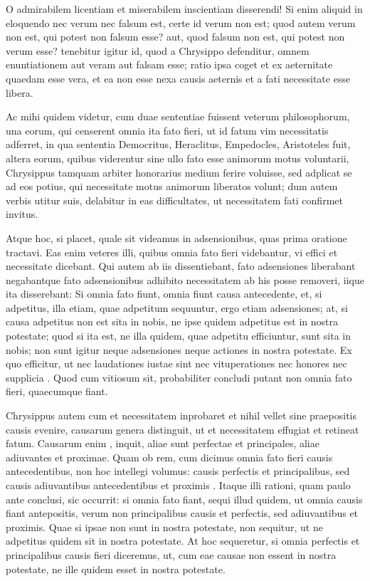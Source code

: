  O admirabilem licentiam et miserabilem inscientiam disserendi! Si enim aliquid in eloquendo nec verum nec falsum est, certe id verum non est; quod autem verum non est, qui potest non falsum esse? aut, quod falsum non est, qui potest non verum esse? tenebitur igitur id, quod a Chrysippo defenditur, omnem enuntiationem aut veram aut falsam esse; ratio ipsa coget et ex aeternitate quaedam esse vera, et ea non esse nexa causis aeternis et a fati necessitate esse libera.

 Ac mihi quidem videtur, cum duae sententiae fuissent veterum philosophorum, una eorum, qui censerent omnia ita fato fieri, ut id fatum vim necessitatis adferret, in qua sententia Democritus, Heraclitus, Empedocles, Aristoteles fuit, altera eorum, quibus viderentur sine ullo fato esse animorum motus voluntarii, Chrysippus tamquam arbiter honorarius medium ferire voluisse, sed adplicat se ad eos potius, qui necessitate motus animorum liberatos volunt; dum autem verbis utitur suis, delabitur in eas difficultates, ut necessitatem fati confirmet invitus.

 Atque hoc, si placet, quale sit videamus in adsensionibus, quas prima oratione tractavi. Eas enim veteres illi, quibus omnia fato fieri videbantur, vi effici et necessitate dicebant. Qui autem ab iis dissentiebant, fato adsensiones liberabant negabantque fato adsensionibus adhibito necessitatem ab his posse removeri, iique ita disserebant: Si omnia fato fiunt, omnia fiunt causa antecedente, et, si adpetitus, illa etiam, quae adpetitum sequuntur, ergo etiam adsensiones; at, si causa adpetitus non est sita in nobis, ne ipse quidem adpetitus est in nostra potestate; quod si ita est, ne illa quidem, quae adpetitu efficiuntur, sunt sita in nobis; non sunt igitur neque adsensiones neque actiones in nostra potestate. Ex quo efficitur, ut nec laudationes iustae sint nec vituperationes nec honores nec supplicia . Quod cum vitiosum sit, probabiliter concludi putant non omnia fato fieri, quaecumque fiant.

 Chrysippus autem cum et necessitatem inprobaret et nihil vellet sine praepositis causis evenire, causarum genera distinguit, ut et necessitatem effugiat et retineat fatum. Causarum enim , inquit, aliae sunt perfectae et principales, aliae adiuvantes et proximae. Quam ob rem, cum dicimus omnia fato fieri causis antecedentibus, non hoc intellegi volumus: causis perfectis et principalibus, sed causis adiuvantibus antecedentibus et proximis . Itaque illi rationi, quam paulo ante conclusi, sic occurrit: si omnia fato fiant, sequi illud quidem, ut omnia causis fiant antepositis, verum non principalibus causis et perfectis, sed adiuvantibus et proximis. Quae si ipsae non sunt in nostra potestate, non sequitur, ut ne adpetitus quidem sit in nostra potestate. At hoc sequeretur, si omnia perfectis et principalibus causis fieri diceremus, ut, cum eae causae non essent in nostra potestate, ne ille quidem esset in nostra potestate.

